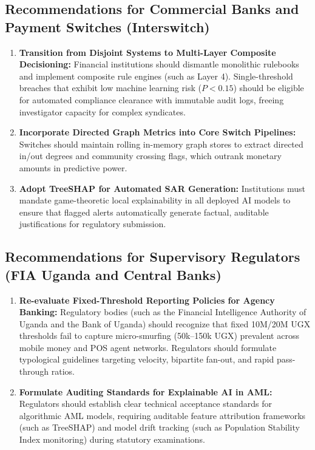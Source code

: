\subsection{Recommendations for Commercial Banks and Payment Switches (Interswitch)}
\begin{enumerate}
    \item \textbf{Transition from Disjoint Systems to Multi-Layer Composite Decisioning:} Financial institutions should dismantle monolithic rulebooks and implement composite rule engines (such as Layer 4). Single-threshold breaches that exhibit low machine learning risk ($P < 0.15$) should be eligible for automated compliance clearance with immutable audit logs, freeing investigator capacity for complex syndicates.
    \item \textbf{Incorporate Directed Graph Metrics into Core Switch Pipelines:} Switches should maintain rolling in-memory graph stores to extract directed in/out degrees and community crossing flags, which outrank monetary amounts in predictive power.
    \item \textbf{Adopt TreeSHAP for Automated SAR Generation:} Institutions must mandate game-theoretic local explainability in all deployed AI models to ensure that flagged alerts automatically generate factual, auditable justifications for regulatory submission.
\end{enumerate}

\subsection{Recommendations for Supervisory Regulators (FIA Uganda and Central Banks)}
\begin{enumerate}
    \item \textbf{Re-evaluate Fixed-Threshold Reporting Policies for Agency Banking:} Regulatory bodies (such as the Financial Intelligence Authority of Uganda and the Bank of Uganda) should recognize that fixed 10M/20M UGX thresholds fail to capture micro-smurfing (50k--150k UGX) prevalent across mobile money and POS agent networks. Regulators should formulate typological guidelines targeting velocity, bipartite fan-out, and rapid pass-through ratios.
    \item \textbf{Formulate Auditing Standards for Explainable AI in AML:} Regulators should establish clear technical acceptance standards for algorithmic AML models, requiring auditable feature attribution frameworks (such as TreeSHAP) and model drift tracking (such as Population Stability Index monitoring) during statutory examinations.
\end{enumerate}

